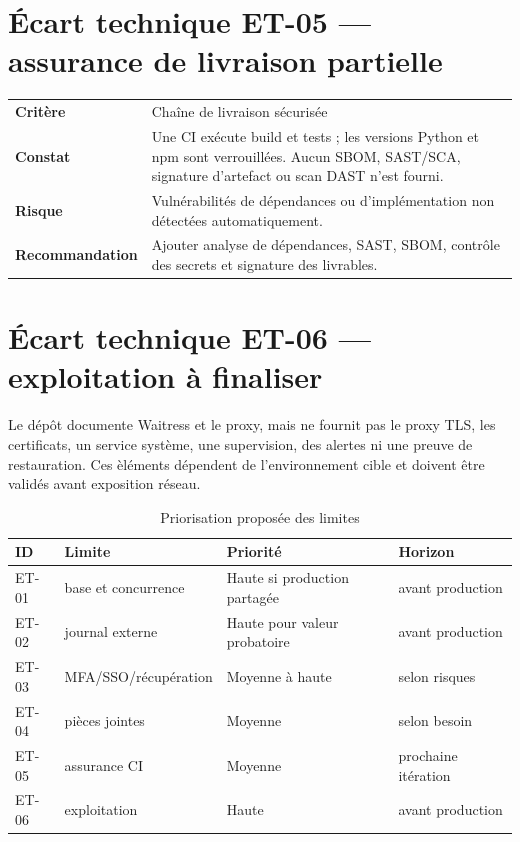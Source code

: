 \section*{\'Ecart technique ET-05 --- assurance de livraison partielle}
\begin{tabularx}{\textwidth}{>{\bfseries}p{3.8cm}X}
\toprule
Crit\`ere & Cha\^ine de livraison s\'ecuris\'ee\\
Constat & Une CI ex\'ecute build et tests ; les versions Python et npm sont verrouill\'ees. Aucun SBOM, SAST/SCA, signature d'artefact ou scan DAST n'est fourni.\\
Risque & Vuln\'erabilit\'es de d\'ependances ou d'impl\'ementation non d\'etect\'ees automatiquement.\\
Recommandation & Ajouter analyse de d\'ependances, SAST, SBOM, contr\^ole des secrets et signature des livrables.\\
\bottomrule
\end{tabularx}

\section*{\'Ecart technique ET-06 --- exploitation \`a finaliser}
Le d\'ep\^ot documente Waitress et le proxy, mais ne fournit pas le proxy TLS, les certificats, un service syst\`eme, une supervision, des alertes ni une preuve de restauration. Ces \`el\'ements d\'ependent de l'environnement cible et doivent \^etre valid\'es avant exposition r\'eseau.

\begin{table}[H]
\centering
\caption{Priorisation propos\'ee des limites}
\begin{tabularx}{\textwidth}{p{2cm}X p{2.6cm}p{2.6cm}}
\toprule
\rowcolor{AuditLight}ID & Limite & Priorit\'e & Horizon\\
\midrule
ET-01 & base et concurrence & Haute si production partag\'ee & avant production\\
ET-02 & journal externe & Haute pour valeur probatoire & avant production\\
ET-03 & MFA/SSO/r\'ecup\'eration & Moyenne \`a haute & selon risques\\
ET-04 & pi\`eces jointes & Moyenne & selon besoin\\
ET-05 & assurance CI & Moyenne & prochaine it\'eration\\
ET-06 & exploitation & Haute & avant production\\
\bottomrule
\end{tabularx}
\end{table}
